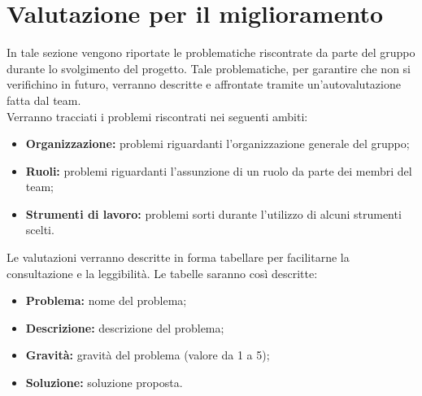 \section{Valutazione per il miglioramento}
In tale sezione vengono riportate le problematiche riscontrate da parte del gruppo durante lo svolgimento del progetto. Tale problematiche, per garantire che non si verifichino in futuro, verranno descritte e affrontate tramite un'autovalutazione fatta dal team.\\
Verranno tracciati i problemi riscontrati nei seguenti ambiti:
\begin{itemize}
	\item \textbf{Organizzazione:} problemi riguardanti l'organizzazione generale del gruppo;
	\item \textbf{Ruoli:} problemi riguardanti l'assunzione di un ruolo da parte dei membri del team;
	\item \textbf{Strumenti di lavoro:}  problemi sorti durante l'utilizzo di alcuni strumenti scelti.
\end{itemize}
Le valutazioni verranno descritte in forma tabellare per facilitarne la consultazione e la leggibilità. Le tabelle saranno così descritte:
\begin{itemize}
	\item \textbf{Problema:} nome del problema;
	\item \textbf{Descrizione:} descrizione del problema;
	\item \textbf{Gravità:} gravità del problema (valore da 1 a 5);
	\item \textbf{Soluzione:} soluzione proposta.
\end{itemize}



\newpage

